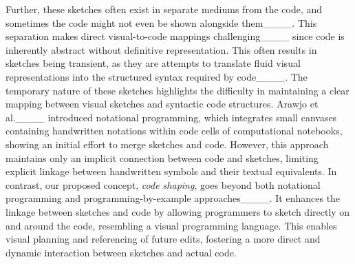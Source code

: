 Further, these sketches often exist in separate mediums from the code, and sometimes the code might not even be shown alongside them____. 
This separation makes direct visual-to-code mappings challenging____ since code is inherently abstract without definitive representation.
This often results in sketches being transient, as they are attempts to translate fluid visual representations into the structured syntax required by code____. The temporary nature of these sketches highlights the difficulty in maintaining a clear mapping between visual sketches and syntactic code structures. Arawjo et al.____ introduced notational programming, which integrates small canvases containing handwritten notations within code cells of computational notebooks, showing an initial effort to merge sketches and code. However, this approach maintains only an implicit connection between code and sketches, limiting explicit linkage between handwritten symbols and their textual equivalents.
In contrast, our proposed concept, \textit{code shaping}, goes beyond both notational programming and programming-by-example approaches____. It enhances the linkage between sketches and code by allowing programmers to sketch directly on and around the code, resembling a visual programming language. This enables visual planning and referencing of future edits, fostering a more direct and dynamic interaction between sketches and actual code. 












